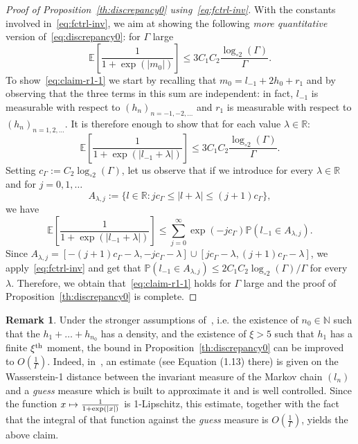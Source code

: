 \documentclass[10pt]{amsart}
\theoremstyle{definition}\newtheorem{defi}[theo]{Definition}\newtheorem{rema}[theo]{Remark}\newtheorem{exam}[theo]{Example}\newtheorem{exem}[theo]{Example}\newtheorem{nota}[theo]{Notation}
\newcommand{\N}{\mathbb{N}}
\newcommand{\bbE}{\mathbb{E}}
\newcommand{\bbP}{\mathbb{P}}
\newcommand{\bbR}{\mathbb{R}}
\newcommand{\gG}{\Gamma}
\newcommand{\loglog}{\log_{\circ 2}}
\let\oldmapsto\mapsto
\renewcommand*{\mapsto}{\mathchoice{\longmapsto}{\oldmapsto}{\oldmapsto}{\oldmapsto}}
\begin{document}
\begin{proof}[Proof of Proposition~\ref{th:discrepancy0} using~\eqref{eq:fctrl-inv}]
With the constants involved in~\eqref{eq:fctrl-inv}, we aim at showing the following \emph{more quantitative} version of~\eqref{eq:discrepancy0}: for $\gG$ large
\begin{equation}\label{eq:claim-r1-1}
\bbE \left[
\frac {1} {1+ \exp\left(\left| m_0\right|\right)}
\right]\le 3C_1 C_2 \frac {\loglog (\gG)} \gG.
\end{equation}
To show~\eqref{eq:claim-r1-1} we start by recalling that $m_0=l_{-1}+2h_0+r_1$ and by observing that the three terms in this sum are independent: in fact, $l_{-1}$ is measurable with respect to $(h_{n})_{n=-1, -2, \dots}$ and $r_1$ is measurable with respect to $(h_n)_{n=1,2, \dots}$. It is therefore enough to show that for each value $\lambda\in\bbR$:
\begin{equation}
\bbE \left[
\frac {1} {1+ \exp\left(\left| l_{-1}+\lambda\right|\right)}
\right]\le 3C_1 C_2 \frac {\loglog (\gG)} \gG.
\end{equation}
Setting $c_\gG:= C_2 \loglog(\gG)$, let us observe that if we introduce for every $\lambda\in \bbR$ and for $j=0,1, \dots$
\begin{equation}
A_{\lambda, j}:= \bigl\{l\in\bbR: j c_\gG \le | l+\lambda | \le (j+1) c_\gG \bigr\},
\end{equation}
we have
\begin{equation}
\bbE \left[
\frac {1} {1+ \exp\left(\left| l_{-1}+\lambda\right|\right)}
\right]\le
\sum_{j =0}^\infty \exp\left(-j c_\gG\right) \bbP\left(l_{-1} \in A_{\lambda, j} \right).
\end{equation}
Since $A_{\lambda, j}= [- (j+1)c_\gG -\lambda, - jc_\gG -\lambda]\cup [jc_\gG -\lambda, (j+1)c_\gG -\lambda]$, { we apply~\eqref{eq:fctrl-inv} and get that $\bbP(l_{-1} \in A_{\lambda, j})\le 2C_1 C_2 \loglog (\gG)/ \gG $ for every $\lambda$.} Therefore, we obtain that~\eqref{eq:claim-r1-1} holds for $\gG$ large and the proof of Proposition~\ref{th:discrepancy0} is complete.
\end{proof}

\begin{rema}
Under the stronger assumptions of~\cite{cf:CGGH}, i.e. the existence of $n_0\in \N$ such that the $h_1+\dots +h_{n_0}$ has a density, and the existence of $\xi>5$ such that $h_1$ has a finite $\xi^{\rm th}$ moment, the bound in Proposition~\ref{th:discrepancy0} can be improved to $O(\frac{1}{\gG})$. Indeed, in~\cite{cf:CGGH}, an estimate (see Equation (1.13) there) is given on the Wasserstein-1 distance between the invariant measure of the Markov chain $(l_n)$ and a \emph{guess} measure which is built to approximate it and is well controlled. Since the function $x\mapsto \frac{1}{1+\exp(|x|)}$ is 1-Lipschitz, this estimate, together with the fact that the integral of that function against the \emph{guess} measure is $O(\frac{1}{\gG})$, yields the above claim.
\end{rema}
\end{document}
